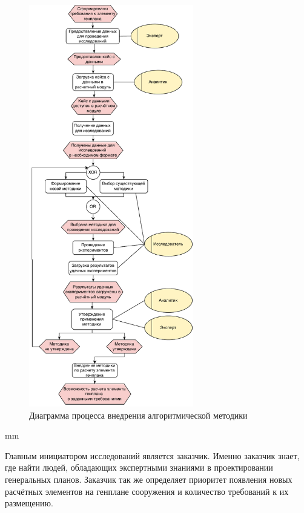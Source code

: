 \begin{figure}[H]
	\hspace*{-2.5 cm}\includegraphics[width=0.64\textwidth, left]{analysis/pictures/usecases/common_epc}
	\caption{Диаграмма процесса внедрения алгоритмической методики}
	\label{pic:analysis__usecases-epc}
\end{figure}
 mm

Главным инициатором исследований является заказчик. Именно заказчик знает, где найти людей,
обладающих экспертными знаниями в проектировании генеральных планов.
Заказчик так же определяет приоритет появления
новых расчётных элементов на генплане сооружения и количество требований к их размещению.

